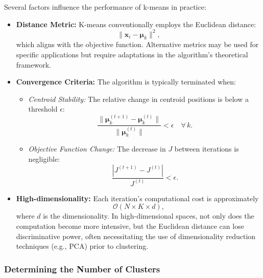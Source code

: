 \documentclass[12pt]{article}
\begin{document}
Several factors influence the performance of k-means in practice:
\begin{itemize}
    \item \textbf{Distance Metric:} K-means conventionally employs the Euclidean distance:
    \[
    \lVert \bm{x}_i - \bm{\mu}_k \rVert^2,
    \]
    which aligns with the objective function. Alternative metrics may be used for specific applications but require adaptations in the algorithm’s theoretical framework.
    \item \textbf{Convergence Criteria:} The algorithm is typically terminated when:
    \begin{itemize}
        \item \textit{Centroid Stability:} The relative change in centroid positions is below a threshold $\epsilon$:
        \[
        \frac{\lVert \bm{\mu}_k^{(t+1)} - \bm{\mu}_k^{(t)} \rVert}{\lVert \bm{\mu}_k^{(t)} \rVert} < \epsilon \quad \forall\, k.
        \]
        \item \textit{Objective Function Change:} The decrease in $J$ between iterations is negligible:
        \[
        \frac{|J^{(t+1)} - J^{(t)}|}{J^{(t)}} < \epsilon.
        \]
    \end{itemize}
    \item \textbf{High-dimensionality:} Each iteration’s computational cost is approximately
    \[
    \mathcal{O}(N \times K \times d),
    \]
    where $d$ is the dimensionality. In high-dimensional spaces, not only does the computation become more intensive, but the Euclidean distance can lose discriminative power, often necessitating the use of dimensionality reduction techniques (e.g., PCA) prior to clustering.
\end{itemize}

\subsubsection{Determining the Number of Clusters}
\end{document}
